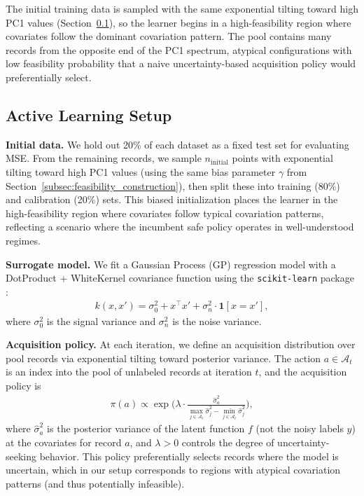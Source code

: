 The initial training data is sampled with the same exponential tilting toward high PC1 values (Section~\ref{subsec:al_setup}), so the learner begins in a high-feasibility region where covariates follow the dominant covariation pattern. The pool contains many records from the opposite end of the PC1 spectrum, atypical configurations with low feasibility probability that a naive uncertainty-based acquisition policy would preferentially select.

\subsection{Active Learning Setup}
\label{subsec:al_setup}

\textbf{Initial data.} We hold out 20\% of each dataset as a fixed test set for evaluating MSE. From the remaining records, we sample $n_{\text{initial}}$ points with exponential tilting toward high PC1 values (using the same bias parameter $\gamma$ from Section~\ref{subsec:feasibility_construction}), then split these into training (80\%) and calibration (20\%) sets. This biased initialization places the learner in the high-feasibility region where covariates follow typical covariation patterns, reflecting a scenario where the incumbent safe policy operates in well-understood regimes.

\textbf{Surrogate model.} We fit a Gaussian Process (GP) regression model with a DotProduct + WhiteKernel covariance function using the \texttt{scikit-learn} package \citep{pedregosa2011scikit}:
\begin{align}
    k(x, x') = \sigma_0^2 + x^\top x' + \sigma_n^2 \cdot \mathbf{1}[x = x'],
\end{align}
where $\sigma_0^2$ is the signal variance and $\sigma_n^2$ is the noise variance.

\textbf{Acquisition policy.} At each iteration, we define an acquisition distribution over pool records via exponential tilting toward posterior variance. The action $a \in \mathcal{A}_t$ is an index into the pool of unlabeled records at iteration $t$, and the acquisition policy is
\begin{align}
    \pi(a) \propto \exp\Big(\lambda \cdot \frac{\hat{\sigma}^2_a}{\max_{j \in \mathcal{A}_t} \hat{\sigma}^2_j - \min_{j \in \mathcal{A}_t} \hat{\sigma}^2_j}\Big),
\end{align}
where $\hat{\sigma}^2_a$ is the posterior variance of the latent function $f$ (not the noisy labels $y$) at the covariates for record $a$, and $\lambda > 0$ controls the degree of uncertainty-seeking behavior. This policy preferentially selects records where the model is uncertain, which in our setup corresponds to regions with atypical covariation patterns (and thus potentially infeasible).

